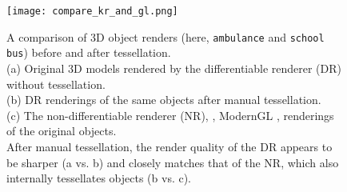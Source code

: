 \documentclass[10pt,twocolumn,letterpaper]{article}
\newcommand{\class}[1]{{\small\texttt{#1}}}
\begin{document}


%


\begin{figure}[h]
	\begin{center}
		\texttt{[image: compare\_kr\_and\_gl.png]}
	\end{center}
	\vspace*{-0.3cm}
	\caption{A comparison of 3D object renders (here, \class{ambulance} and \class{school bus}) before and after tessellation.
		\\(a) Original 3D models rendered by the differentiable renderer (DR) \cite{kato2018neural} without tessellation.
		\\(b) DR renderings of the same objects after manual tessellation.
		\\(c) The non-differentiable renderer (NR), \ie, ModernGL \cite{modernGL}, renderings of the original objects.
		\\After manual tessellation, the render quality of the DR appears to be sharper (a vs. b) and closely matches that of the NR, which also internally tessellates objects (b vs. c).	
		}
	
	\label{fig:compare_tessellation}
\end{figure}
\end{document}
